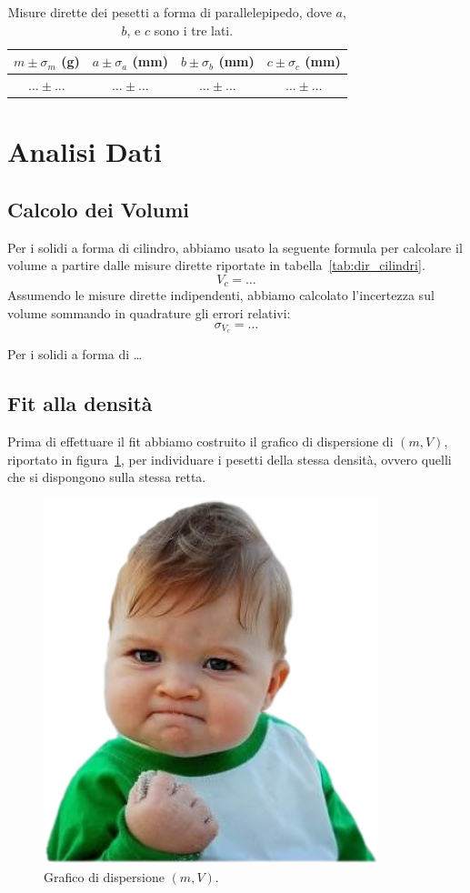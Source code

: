 \documentclass{article}
\begin{document}
\begin{table}[]
    \centering
    \begin{tabular}{c|c|c|c}
      $m\pm \sigma_m$ (g)   & $a\pm\sigma_a$ (mm)  & $b\pm\sigma_b$ (mm)& $c\pm\sigma_c$ (mm)\\
      \hline
       $\ldots \pm \ldots$  & $\ldots \pm \ldots$ & $\ldots \pm \ldots$ & $\ldots \pm \ldots$\\
    \end{tabular}
    \caption{Misure dirette dei pesetti a forma di parallelepipedo, dove $a$, $b$, e $c$ sono i tre lati.}
    \label{tab:dir_paralle}
\end{table}


\section{Analisi Dati}
\subsection{Calcolo dei Volumi}
Per i solidi a forma di cilindro, abbiamo usato la seguente formula per calcolare il volume a partire dalle misure dirette riportate in tabella~\ref{tab:dir_cilindri}.
\begin{equation}
    V_c = \ldots
\end{equation}
Assumendo le misure dirette indipendenti, abbiamo calcolato l'incertezza sul volume sommando in quadrature gli errori relativi:
\begin{equation}
    \sigma_{V_c} = \ldots
\end{equation}

Per i solidi a forma di \ldots

\subsection{Fit alla densit\`a}

Prima di effettuare il fit abbiamo costruito il grafico di dispersione di $(m,V)$, riportato in figura~\ref{fig:dispersione},
per individuare i pesetti della stessa densit\`a, ovvero quelli che si dispongono sulla stessa retta.

\begin{figure}
    \centering
     \includegraphics[width=0.5\linewidth]{stupid.png}
    \caption{Grafico di dispersione $(m,V)$.}
    \label{fig:dispersione}
\end{figure}
\end{document}
